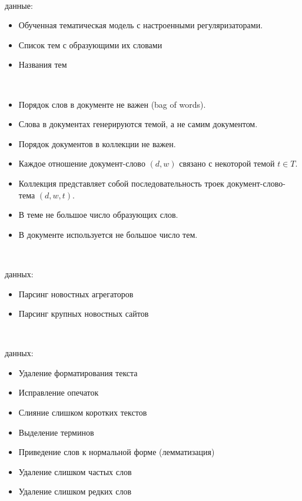 ~\

 данные:

\begin{itemize}
    \item Обученная тематическая модель с настроенными регуляризаторами.
    \item Список тем с образующими их словами
    \item \todo{}Названия тем
\end{itemize}

~\


\begin{itemize}
    \item Порядок слов в документе не важен (bag of words).
    \item Слова в документах генерируются темой, а не самим документом.
    \item Порядок документов в коллекции не важен.
    \item Каждое отношение документ-слово $(d,w)$ связано с некоторой темой $t \in T$.
    \item Коллекция представляет собой последовательность троек документ-слово-тема $(d,w,t)$.
    \item В теме не большое число образующих слов.
    \item В документе используется не большое число тем.
\end{itemize}

~\

 данных:

\begin{itemize}
    \item Парсинг новостных агрегаторов
    \item Парсинг крупных новостных сайтов
\end{itemize}

~\

 данных:

\begin{itemize}
    \item Удаление форматирования текста
    \item Исправление опечаток
    \item Слияние слишком коротких текстов
    \item Выделение терминов
    \item Приведение слов к нормальной форме (лемматизация)
    \item Удаление слишком частых слов
    \item Удаление слишком редких слов
\end{itemize}

